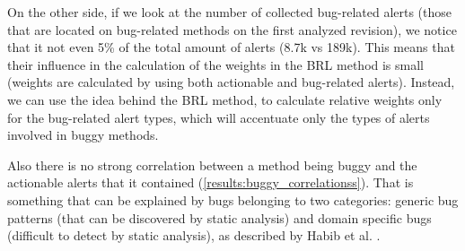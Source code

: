 On the other side, if we look at the number of collected bug-related alerts (those that are located on bug-related methods on the first analyzed revision), we notice that it not even 5\% of the total amount of alerts (8.7k vs 189k). 
This means that their influence in the calculation of the weights in the BRL method is small (weights are calculated by using both actionable and bug-related alerts). 
Instead, we can use the idea behind the BRL method, to calculate relative weights only for the bug-related alert types, which will accentuate only the types of alerts involved in buggy methods. 



Also there is no strong correlation between a method being buggy and the actionable alerts that it contained (\cref{results:buggy_correlationss}). That is something that can be explained by bugs belonging to two categories: generic bug patterns (that can be discovered by static analysis) and domain specific bugs (difficult to detect by static analysis), as described by Habib et al. \cite{how_many_bugs}.

